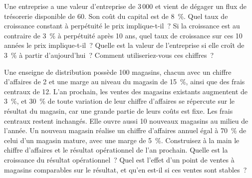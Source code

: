 \begin{question}\label{iq:iv2:valuation-and-financial-statements:22}
Une entreprise a une valeur d'entreprise de 3\,000 et vient de dégager un flux de trésorerie disponible de 60. Son coût du capital est de 8~\%. Quel taux de croissance constant à perpétuité le prix implique-t-il~? Si la croissance est au contraire de 3~\% à perpétuité après 10 ans, quel taux de croissance sur ces 10 années le prix implique-t-il~? Quelle est la valeur de l'entreprise si elle croît de 3~\% à partir d'aujourd'hui~? Comment utiliseriez-vous ces chiffres~?
\end{question}

\begin{question}\label{iq:iv2:valuation-and-financial-statements:23}
Une enseigne de distribution possède 100 magasins, chacun avec un chiffre d'affaires de 2 et une marge au niveau du magasin de 15~\%, ainsi que des frais centraux de 12. L'an prochain, les ventes des magasins existants augmentent de 3~\%, et 30~\% de toute variation de leur chiffre d'affaires se répercute sur le résultat du magasin, car une grande partie de leurs coûts est fixe. Les frais centraux restent inchangés. Elle ouvre aussi 10 nouveaux magasins au milieu de l'année. Un nouveau magasin réalise un chiffre d'affaires annuel égal à 70~\% de celui d'un magasin mature, avec une marge de 5~\%. Construisez à la main le chiffre d'affaires et le résultat opérationnel de l'an prochain. Quelle est la croissance du résultat opérationnel~? Quel est l'effet d'un point de ventes à magasins comparables sur le résultat, et qu'en est-il si ces ventes sont stables~?
\end{question}

